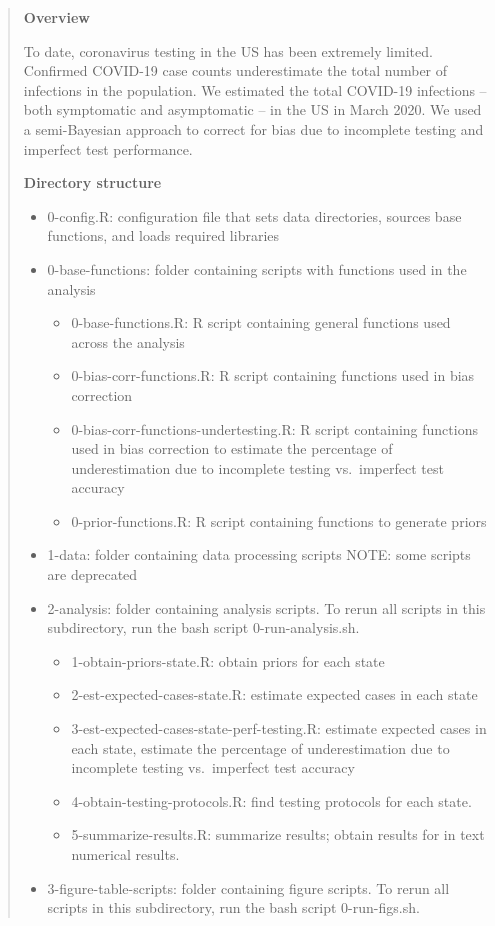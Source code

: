 \documentclass[
]{book}
\begin{document}
\begin{quote}
\textbf{Overview}

To date, coronavirus testing in the US has been extremely limited. Confirmed COVID-19 case counts underestimate the total number of infections in the population. We estimated the total COVID-19 infections -- both symptomatic and asymptomatic -- in the US in March 2020. We used a semi-Bayesian approach to correct for bias due to incomplete testing and imperfect test performance.

\textbf{Directory structure}

\begin{itemize}
\item
  0-config.R: configuration file that sets data directories, sources base functions, and loads required libraries
\item
  0-base-functions: folder containing scripts with functions used in the analysis

  \begin{itemize}
  \item
    0-base-functions.R: R script containing general functions used across the analysis
  \item
    0-bias-corr-functions.R: R script containing functions used in bias correction
  \item
    0-bias-corr-functions-undertesting.R: R script containing functions used in bias correction to estimate the percentage of underestimation due to incomplete testing vs.~imperfect test accuracy
  \item
    0-prior-functions.R: R script containing functions to generate priors
  \end{itemize}
\item
  1-data: folder containing data processing scripts NOTE: some scripts are deprecated
\item
  2-analysis: folder containing analysis scripts. To rerun all scripts in this subdirectory, run the bash script 0-run-analysis.sh.

  \begin{itemize}
  \item
    1-obtain-priors-state.R: obtain priors for each state
  \item
    2-est-expected-cases-state.R: estimate expected cases in each state
  \item
    3-est-expected-cases-state-perf-testing.R: estimate expected cases in each state, estimate the percentage of underestimation due to incomplete testing vs.~imperfect test accuracy
  \item
    4-obtain-testing-protocols.R: find testing protocols for each state.
  \item
    5-summarize-results.R: summarize results; obtain results for in text numerical results.
  \end{itemize}
\item
  3-figure-table-scripts: folder containing figure scripts. To rerun all scripts in this subdirectory, run the bash script 0-run-figs.sh.


\end{itemize}
\end{quote}
\end{document}
